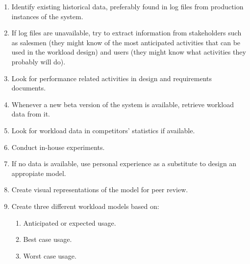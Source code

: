 \begin{enumerate}
  \item Identify existing historical data, preferably found in log files from
    production instances of the system.
  \item If log files are unavailable, try to extract information from
    stakeholders such as salesmen (they might know of the most anticipated
    activities that can be used in the workload design) and users (they might
    know what activities they probably will do).
  \item Look for performance related activities in design and requirements
    documents.
  \item Whenever a new beta version of the system is available, retrieve
    workload data from it.
  \item Look for workload data in competitors' statistics if available.
  \item Conduct in-house experiments.
  \item If no data is available, use personal experience as a substitute to
    design an appropiate model.
  \item Create visual representations of the model for peer review.
  \item Create three different workload models based on:
    \begin{enumerate}
      \item Anticipated or expected usage.
      \item Best case usage.
      \item Worst case usage.
    \end{enumerate}
\end{enumerate}

